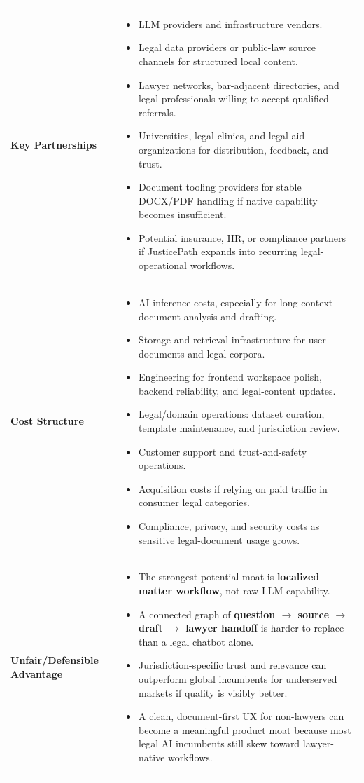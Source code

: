 \documentclass[11pt]{article}
\begin{document}
\begin{longtable}{p{} p{}}
\textbf{Key Partnerships} &
\begin{itemize}
  \item LLM providers and infrastructure vendors.
  \item Legal data providers or public-law source channels for structured local content.
  \item Lawyer networks, bar-adjacent directories, and legal professionals willing to accept qualified referrals.
  \item Universities, legal clinics, and legal aid organizations for distribution, feedback, and trust.
  \item Document tooling providers for stable DOCX/PDF handling if native capability becomes insufficient.
  \item Potential insurance, HR, or compliance partners if JusticePath expands into recurring legal-operational workflows.
\end{itemize} \\

\textbf{Cost Structure} &
\begin{itemize}
  \item AI inference costs, especially for long-context document analysis and drafting.
  \item Storage and retrieval infrastructure for user documents and legal corpora.
  \item Engineering for frontend workspace polish, backend reliability, and legal-content updates.
  \item Legal/domain operations: dataset curation, template maintenance, and jurisdiction review.
  \item Customer support and trust-and-safety operations.
  \item Acquisition costs if relying on paid traffic in consumer legal categories.
  \item Compliance, privacy, and security costs as sensitive legal-document usage grows.
\end{itemize} \\

\textbf{Unfair/Defensible Advantage} &
\begin{itemize}
  \item The strongest potential moat is \textbf{localized matter workflow}, not raw LLM capability.
  \item A connected graph of \textbf{question $\rightarrow$ source $\rightarrow$ draft $\rightarrow$ lawyer handoff} is harder to replace than a legal chatbot alone.
  \item Jurisdiction-specific trust and relevance can outperform global incumbents for underserved markets if quality is visibly better.
  \item A clean, document-first UX for non-lawyers can become a meaningful product moat because most legal AI incumbents still skew toward lawyer-native workflows.
\end{itemize} \\

\bottomrule
\end{longtable}
\end{document}

